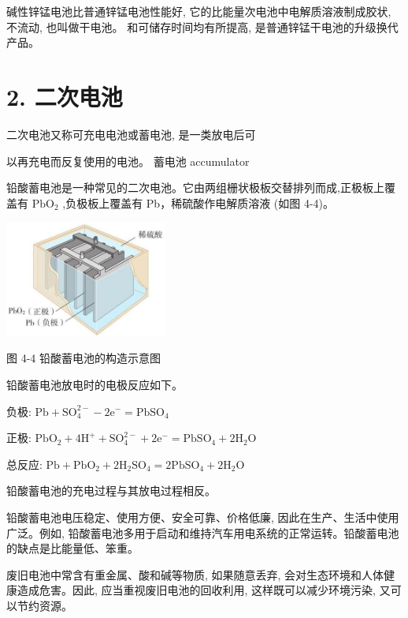 \documentclass[10pt]{article}
\begin{document}
碱性锌锰电池比普通锌锰电池性能好, 它的比能量次电池中电解质溶液制成胶状, 不流动, 也叫做干电池。 和可储存时间均有所提高, 是普通锌锰干电池的升级换代产品。

\section*{2. 二次电池}

二次电池又称可充电电池或蓄电池, 是一类放电后可

以再充电而反复使用的电池。 蓄电池 accumulator

铅酸蓄电池是一种常见的二次电池。它由两组栅状极板交替排列而成,正极板上覆盖有 \({\mathrm{{PbO}}}_{2}\) ,负极板上覆盖有 Pb，稀硫酸作电解质溶液 (如图 4-4)。

\begin{center}
\includegraphics[max width=0.4\textwidth]{images/0190da9d-8bfd-732f-bc2c-0b21d0f13b91_104_943984.jpg}
\end{center}

图 4-4 铅酸蓄电池的构造示意图

铅酸蓄电池放电时的电极反应如下。

负极: \(\mathrm{{Pb}} + {\mathrm{{SO}}}_{4}^{2 - } - 2{\mathrm{e}}^{ - } = {\mathrm{{PbSO}}}_{4}\)

正极: \({\mathrm{{PbO}}}_{2} + 4{\mathrm{H}}^{ + } + {\mathrm{{SO}}}_{4}^{2 - } + 2{\mathrm{e}}^{ - } = {\mathrm{{PbSO}}}_{4} + 2{\mathrm{H}}_{2}\mathrm{O}\)

总反应: \(\mathrm{{Pb}} + {\mathrm{{PbO}}}_{2} + 2{\mathrm{H}}_{2}{\mathrm{{SO}}}_{4} = 2{\mathrm{{PbSO}}}_{4} + 2{\mathrm{H}}_{2}\mathrm{O}\)

铅酸蓄电池的充电过程与其放电过程相反。

铅酸蓄电池电压稳定、使用方便、安全可靠、价格低廉, 因此在生产、生活中使用广泛。例如, 铅酸蓄电池多用于启动和维持汽车用电系统的正常运转。铅酸蓄电池的缺点是比能量低、笨重。

废旧电池中常含有重金属、酸和碱等物质, 如果随意丢弃, 会对生态环境和人体健康造成危害。因此, 应当重视废旧电池的回收利用, 这样既可以减少环境污染, 又可以节约资源。
\end{document}
